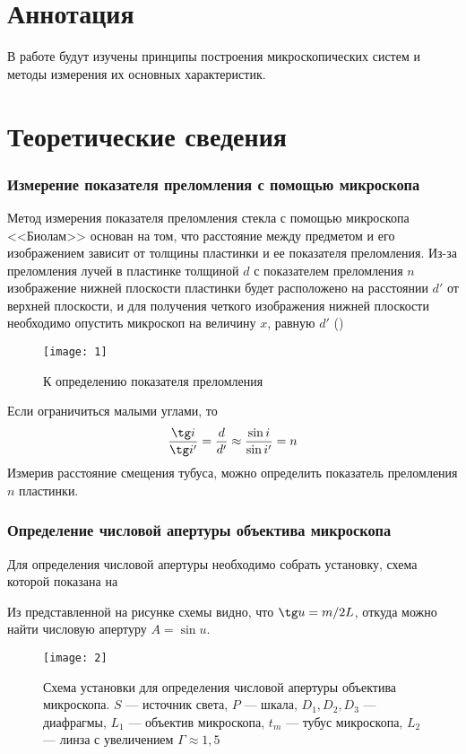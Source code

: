 \documentclass[a4paper, 12pt]{article}
\begin{document}

\section{Аннотация}
В работе будут изучены принципы построения микроскопических систем и
методы измерения их основных характеристик.




\section{Теоретические сведения}
\subsubsection*{Измерение показателя преломления с помощью микроскопа}
Метод измерения показателя преломления стекла с помощью микроскопа
<<Биолам>> основан на том, что расстояние между предметом и его
изображением зависит от толщины пластинки и ее показателя преломления.
Из-за преломления лучей в пластинке толщиной $d$ с показателем
преломления $n$ изображение нижней плоскости пластинки будет расположено
на расстоянии $d'$ от верхней плоскости, и для получения четкого
изображения нижней плоскости необходимо опустить микроскоп на величину
$x$, равную $d'$ ()


\begin{figure}[H]
    \texttt{[image: 1]} 
    \captionsetup{justification=centering}
    \caption{К определению показателя преломления}
    \label{fig:n}
\end{figure}

Если ограничиться малыми углами, то
\begin{equation}
    \frac{\tg i}{\tg i'} = \frac{d}{d'} \approx \frac{\sin i}{\sin i'}
    = n
    \label{eq:one}
\end{equation}
Измерив расстояние смещения тубуса, можно определить показатель
преломления $n$ пластинки.

\subsubsection*{Определение числовой апертуры объектива микроскопа}
Для определения числовой апертуры необходимо собрать установку,
схема которой показана на 

Из представленной на рисунке схемы видно, что $\tg u = m/2L$, откуда
можно найти числовую апертуру $A = \sin u$.


\begin{figure}[H]
    \texttt{[image: 2]} 
    \caption{Схема установки для определения числовой апертуры
    объектива микроскопа. $S$ --- источник света, $P$ --- шкала, $D_1,
D_2, D_3$ --- диафрагмы, $L_1$ --- объектив микроскопа, $t_m$ ---
тубус микроскопа, $L_2$ --- линза с увеличением $\Gamma \approx 1,5$}
\label{fig:two}
\end{figure}
\end{document}
